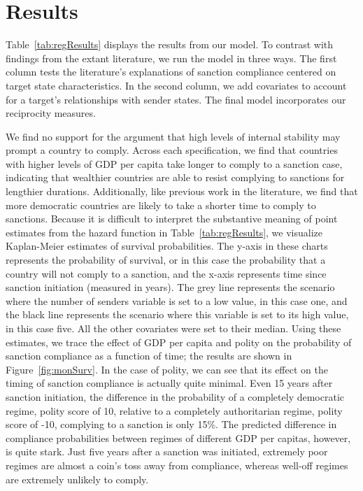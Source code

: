 \section*{Results}
\label{Results} 

Table~\ref{tab:regResults} displays the results from our model. To contrast with findings from the extant literature, we run the model in three ways. The first column tests the literature's explanations of sanction compliance centered on target state characteristics. In the second column, we add covariates to account for a target's relationships with sender states. The final model incorporates our reciprocity measures. 



We find no support for the argument that high levels of internal stability may prompt a country to comply. Across each specification, we find that countries with higher levels of GDP per capita take longer to comply to a sanction case, indicating that wealthier countries are able to resist complying to sanctions for lengthier durations. Additionally, like previous work in the literature, we find that more democratic countries are likely to take a shorter time to comply to sanctions. Because it is difficult to interpret the substantive meaning of point estimates from the hazard function in Table~\ref{tab:regResults}, we visualize Kaplan-Meier estimates of survival probabilities. The y-axis in these charts represents the probability of survival, or in this case the probability that a country will not comply to a sanction, and the x-axis represents time since sanction initiation (measured in years). The grey line represents the scenario where the number of senders variable is set to a low value, in this case one, and the black line represents the scenario where this variable is set to its high value, in this case five. All the other covariates were set to their median. Using these estimates, we trace the effect of GDP per capita and polity on the probability of sanction compliance as a function of time; the results are shown in Figure~\ref{fig:monSurv}. In the case of polity, we can see that its effect on the timing of sanction compliance is actually quite minimal. Even 15 years after sanction initiation, the difference in the probability of a completely democratic regime, polity score of 10, relative to a completely authoritarian regime, polity score of -10, complying to a sanction is only 15\%. The predicted difference in compliance probabilities between regimes of different GDP per capitas, however, is quite stark. Just five years after a sanction was initiated, extremely poor regimes are almost a coin's toss away from compliance, whereas well-off regimes are extremely unlikely to comply. 

